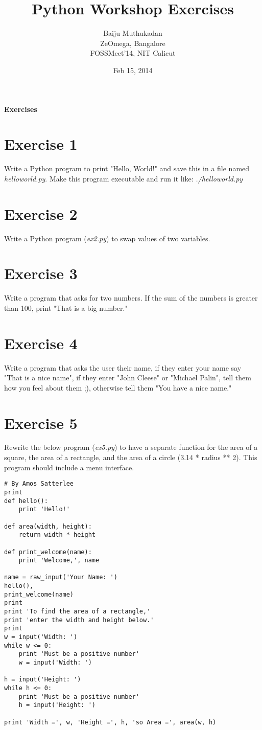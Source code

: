 \documentclass[11pt,a4paper]{article}
\title{\bf{Python Workshop Exercises}}
\author{Baiju Muthukadan \\ ZeOmega, Bangalore \\ FOSSMeet'14, NIT Calicut}
\date{Feb 15, 2014}
\begin{document}
\maketitle

\vspace*{2cm}

\centerline{\LARGE\bf Exercises}
\section*{Exercise 1}
Write a Python program to print "Hello, World!" and save this in a
file named {\it helloworld.py}.  Make this program executable and run
it like: {\it./helloworld.py}

\section*{Exercise 2}
Write a Python program ({\it ex2.py}) to swap values of two variables.

\section*{Exercise 3}
Write a program that asks for two numbers.  If the sum of the numbers
is greater than 100, print "That is a big number."

\section*{Exercise 4}
Write a program that asks the user their name, if they enter your name
say "That is a nice name", if they enter "John Cleese" or "Michael
Palin", tell them how you feel about them ;), otherwise tell them "You
have a nice name."

\section*{Exercise 5}
Rewrite the below program ({\it ex5.py}) to have a separate function
for the area of a square, the area of a rectangle, and the area of a
circle (3.14 * radius ** 2). This program should include a menu
interface.

\begin{verbatim}
# By Amos Satterlee
print
def hello():
    print 'Hello!'
 
def area(width, height):
    return width * height
 
def print_welcome(name):
    print 'Welcome,', name
 
name = raw_input('Your Name: ')
hello(),
print_welcome(name)
print
print 'To find the area of a rectangle,'
print 'enter the width and height below.'
print
w = input('Width: ')
while w <= 0:
    print 'Must be a positive number'
    w = input('Width: ')
 
h = input('Height: ')
while h <= 0:
    print 'Must be a positive number'
    h = input('Height: ')
 
print 'Width =', w, 'Height =', h, 'so Area =', area(w, h)
\end{verbatim}
\end{document}
